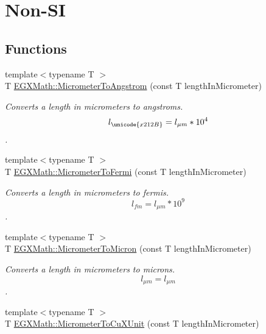 \hypertarget{group___e_g_x_math-_conversions-_length_conversions-_micrometer-_non-_s_i}{}\section{Non-\/\+SI}
\label{group___e_g_x_math-_conversions-_length_conversions-_micrometer-_non-_s_i}
\subsection*{Functions}
\begin{DoxyCompactItemize}
\item 
{\footnotesize template$<$typename T $>$ }\\T \mbox{\hyperlink{group___e_g_x_math-_conversions-_length_conversions-_micrometer-_non-_s_i_ga4b7df35169682046455e9a6f99447777}{E\+G\+X\+Math\+::\+Micrometer\+To\+Angstrom}} (const T length\+In\+Micrometer)
\begin{DoxyCompactList}\small\item\em Converts a length in micrometers to angstroms. \[ l_{\unicode{x212B}}=l_{\mu m} * 10^{4} \]. \end{DoxyCompactList}\item 
{\footnotesize template$<$typename T $>$ }\\T \mbox{\hyperlink{group___e_g_x_math-_conversions-_length_conversions-_micrometer-_non-_s_i_ga23f5f429bc4df952e3d874fb944bd1ce}{E\+G\+X\+Math\+::\+Micrometer\+To\+Fermi}} (const T length\+In\+Micrometer)
\begin{DoxyCompactList}\small\item\em Converts a length in micrometers to fermis. \[ l_{fm}=l_{\mu m} * 10^{9} \]. \end{DoxyCompactList}\item 
{\footnotesize template$<$typename T $>$ }\\T \mbox{\hyperlink{group___e_g_x_math-_conversions-_length_conversions-_micrometer-_non-_s_i_ga5dc2a5dba0313f6a71db082aff501329}{E\+G\+X\+Math\+::\+Micrometer\+To\+Micron}} (const T length\+In\+Micrometer)
\begin{DoxyCompactList}\small\item\em Converts a length in micrometers to microns. \[ l_{\mu m}=l_{\mu m} \]. \end{DoxyCompactList}\item 
{\footnotesize template$<$typename T $>$ }\\T \mbox{\hyperlink{group___e_g_x_math-_conversions-_length_conversions-_micrometer-_non-_s_i_ga9ec609bbfdde5144c9f40d9093a5b8a7}{E\+G\+X\+Math\+::\+Micrometer\+To\+Cu\+X\+Unit}} (const T length\+In\+Micrometer)

\end{DoxyCompactItemize}
